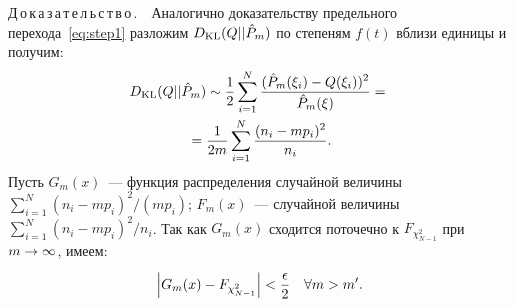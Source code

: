 \begin{multicols}{2}
\noindent
Д\,о\,к\,а\,з\,а\,т\,е\,л\,ь\,с\,т\,в\,о\,.\ \
Аналогично доказательству предельного перехода~\eqref{eq:step1}
разложим $D_{\mathrm{KL}}(Q||\hat{P}_m)$ по степеням $f(t)$ вблизи единицы и получим:
\begin{multline*}
D_{\mathrm{KL}}(Q||\hat{P}_m) \sim \displaystyle\frac{\displaystyle 1\mathstrut}{\displaystyle 2\mathstrut} \sum\limits_{i=1}^{N}
\displaystyle\frac{\displaystyle (\hat{P}_m(\xi_i) - Q(\xi_i))^2\mathstrut}{\displaystyle \hat{P}_m(\xi)\mathstrut} = {}\\
{}=\displaystyle\frac{\displaystyle 1\mathstrut}{\displaystyle 2m\mathstrut}
\sum\limits_{i=1}^{N}\displaystyle\frac{\displaystyle (n_i - mp_i)^2\mathstrut}{\displaystyle n_i\mathstrut}.
\end{multline*}
Пусть $G_m(x)$~--- функция распределения случайной величины
$\sum\limits_{i=1}^{N} {(n_i - mp_i)^2}/(mp_i)$; $F_m(x)$~---
случайной величины $\sum\limits_{i=1}^{N}{(n_i - mp_i)^2}/{n_i}$. Так как
$G_m(x)$ сходится поточечно к $F_{\chi^2_{N-1}}$ при $m\hm\rightarrow\infty$, имеем:
$$
\left\vert G_m(x) - F_{\chi_{N-1}^2}\right\vert <
\displaystyle\frac{\displaystyle \epsilon\mathstrut}{\displaystyle 2\mathstrut} \quad \forall m > m'.
$$


\end{multicols}
